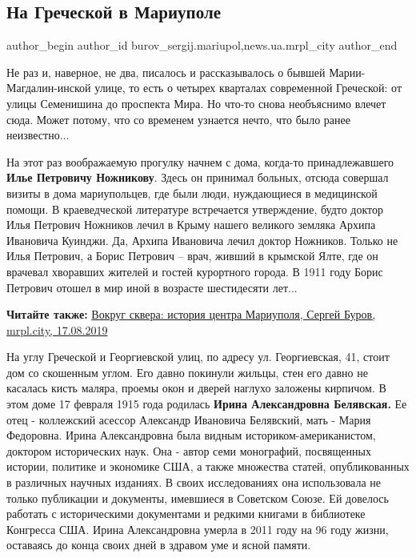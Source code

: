  
 
 
 
 
 
\subsection{На Греческой в Мариуполе}
\label{sec:09_11_2019.stz.news.ua.mrpl_city.1.na_grecheskoj_v_mariupole}
 
\ifcmt
 author_begin
   author_id burov_sergij.mariupol,news.ua.mrpl_city
 author_end
\fi

Не раз и, наверное, не два, писалось и рассказывалось о бывшей
Марии-Магдалин\hyp{}инской улице, то есть о четырех кварталах современной Греческой:
от улицы Семенишина до проспекта Мира. Но что-то снова необъяснимо влечет сюда.
Может потому, что со временем узнается нечто, что было ранее неизвестно...


На этот раз воображаемую прогулку начнем с дома, когда-то принадлежавшего \textbf{Илье
Петровичу Ножникову}. Здесь он принимал больных, отсюда совершал визиты в дома
мариупольцев, где были люди, нуждающиеся в медицинской помощи. В краеведческой
литературе встречается утверждение, будто доктор Илья Петрович Ножников лечил в
Крыму нашего великого земляка Архипа Ивановича Куинджи. Да, Архипа Ивановича
лечил доктор Ножников. Только не Илья Петрович, а Борис Петрович – врач, живший
в крымской Ялте, где он врачевал хворавших жителей и гостей курортного города.
В 1911 году Борис Петрович отошел в мир иной в возрасте шестидесяти лет...

\textbf{Читайте также:} \href{https://mrpl.city/blogs/view/vokrug-skvera-istoriya-tsentra-mariupolya}{%
Вокруг сквера: история центра Мариуполя, Сергей Буров, mrpl.city, 17.08.2019}

На углу Греческой и Георгиевской улиц, по адресу ул. Георгиевская, 41, стоит
дом со скошенным углом. Его давно покинули жильцы, стен его давно не касалась
кисть маляра, проемы окон и дверей наглухо заложены кирпичом. В этом доме 17
февраля 1915 года родилась \textbf{Ирина Александровна Белявская.} Ее отец - коллежский
асессор Александр Ивановича Белявский, мать - Мария Федоровна. Ирина
Александровна была видным историком-американистом, доктором исторических наук.
Она - автор семи монографий, посвященных истории, политике и экономике США, а
также множества статей, опубликованных в различных научных изданиях. В своих
исследованиях она использовала не только публикации и документы, имевшиеся в
Советском Союзе. Ей довелось работать с историческими документами и редкими
книгами в библиотеке Конгресса США. Ирина Александровна умерла в 2011 году на
96 году жизни, оставаясь до конца своих дней в здравом уме и ясной памяти.

